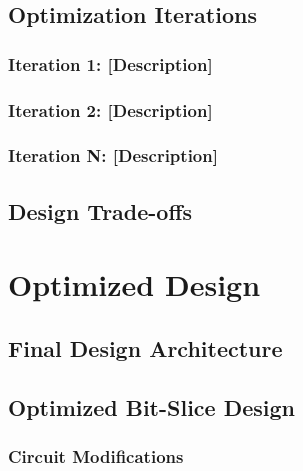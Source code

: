 \documentclass[12pt,letterpaper]{article}
\begin{document}

\subsection{Optimization Iterations}

\subsubsection{Iteration 1: [Description]}


\subsubsection{Iteration 2: [Description]}

\subsubsection{Iteration N: [Description]}

\subsection{Design Trade-offs}


\section{Optimized Design}
\label{sec:optimized}


\subsection{Final Design Architecture}

\subsection{Optimized Bit-Slice Design}

\subsubsection{Circuit Modifications}
\end{document}
